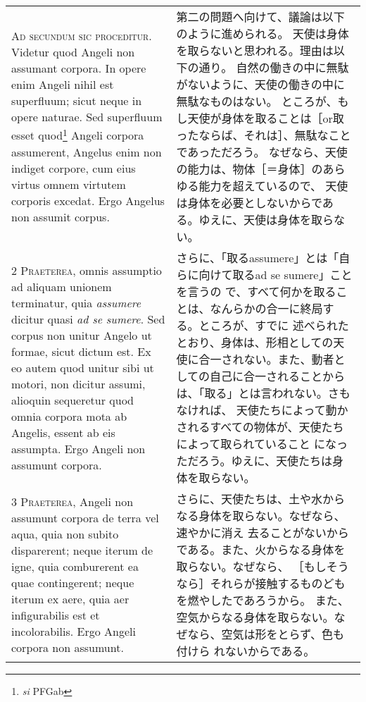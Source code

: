 \documentclass[10pt]{jsarticle} %
\begin{document}
\begin{longtable}{p{21em}p{21em}}

{\huge A}{\scshape d secundum sic proceditur}. Videtur quod
Angeli non assumant corpora. In opere enim Angeli nihil est superfluum;
sicut neque in opere naturae. Sed superfluum esset
 quod\footnote{{\itshape si} PFGab} Angeli corpora
assumerent, Angelus enim non indiget corpore, cum eius virtus omnem
virtutem corporis excedat. Ergo Angelus non assumit corpus.

&
第二の問題へ向けて、議論は以下のように進められる。
天使は身体を取らないと思われる。理由は以下の通り。
自然の働きの中に無駄がないように、天使の働きの中に無駄なものはない。
ところが、もし天使が身体を取ることは［or取ったならば、それは］、無駄なことであっただろう。
 なぜなら、天使の能力は、物体［＝身体］のあらゆる能力を超えているので、
 天使は身体を必要としないからである。ゆえに、天使は身体を取らない。

\\


{\scshape 2 Praeterea}, omnis assumptio ad aliquam unionem terminatur,
quia {\itshape assumere} dicitur quasi {\itshape ad se sumere}. Sed
corpus non unitur Angelo ut formae, sicut dictum est. Ex eo autem quod
unitur sibi ut motori, non dicitur assumi, alioquin sequeretur quod
omnia corpora mota ab Angelis, essent ab eis assumpta. Ergo Angeli non
assumunt corpora.

&

さらに、「取るassumere」とは「自らに向けて取るad se sumere」ことを言うの
 で、すべて何かを取ることは、なんらかの合一に終局する。ところが、すでに
 述べられたとおり、身体は、形相としての天使に合一されない。また、動者と
 しての自己に合一されることからは、「取る」とは言われない。さもなければ、
 天使たちによって動かされるすべての物体が、天使たちによって取られていること
 になっただろう。ゆえに、天使たちは身体を取らない。

\\


{\scshape 3 Praeterea}, Angeli non assumunt corpora de
terra vel aqua, quia non subito disparerent; neque iterum de igne, quia
comburerent ea quae contingerent; neque iterum ex aere, quia aer
infigurabilis est et incolorabilis. Ergo Angeli corpora non assumunt.

&
さらに、天使たちは、土や水からなる身体を取らない。なぜなら、速やかに消え
 去ることがないからである。また、火からなる身体を取らない。なぜなら、
 ［もしそうなら］それらが接触するものどもを燃やしたであろうから。
また、空気からなる身体を取らない。なぜなら、空気は形をとらず、色も付けら
 れないからである。


\end{longtable}
\end{document}
